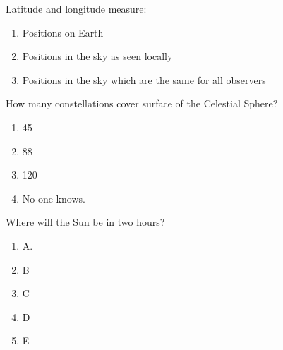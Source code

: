 \documentclass[11pt]{article}
\begin{document}
\begin{enumerate}
\begin{minipage}{\textwidth}
\begin{minipage}{\textwidth}
\end{minipage}
\end{minipage}
\vskip 0.20in

\begin{minipage}{\textwidth}
\begin{minipage}{\textwidth}
\item Latitude and longitude measure:
\begin{enumerate} 
\setlength{\itemsep}{1pt} 
\setlength{\parskip}{0pt} 
\setlength{\parsep}{0pt}
\setlength{\multicolsep}{1pt} 
\item Positions on Earth
\item Positions in the sky as seen locally
\item Positions in the sky which are the same for all observers
\end{enumerate} 
\end{minipage}
\end{minipage}
\vskip 0.20in

\begin{minipage}{\textwidth}
\begin{minipage}{\textwidth}
\item How many constellations cover surface of the Celestial Sphere?
\begin{multicols}{3}
\begin{enumerate} 
\setlength{\itemsep}{1pt} 
\setlength{\parskip}{0pt} 
\setlength{\parsep}{0pt}
\setlength{\multicolsep}{1pt} 
\item 45
\item 88
\item 120
\item No one knows.
\end{enumerate} 
\vfill 
\end{multicols}

\end{minipage}
\end{minipage}
\vskip 0.20in

\begin{minipage}{\textwidth}
\begin{minipage}{\textwidth}
\item Where will the Sun be in two hours?
\begin{multicols}{3}
\begin{enumerate} 
\setlength{\itemsep}{1pt} 
\setlength{\parskip}{0pt} 
\setlength{\parsep}{0pt}
\setlength{\multicolsep}{1pt} 
\item A.
\item B
\item C
\item D
\item E
\end{enumerate} 
\vfill 
\end{multicols}

\end{minipage}
\end{minipage}
\vskip 0.20in

\end{enumerate}
\end{document}
